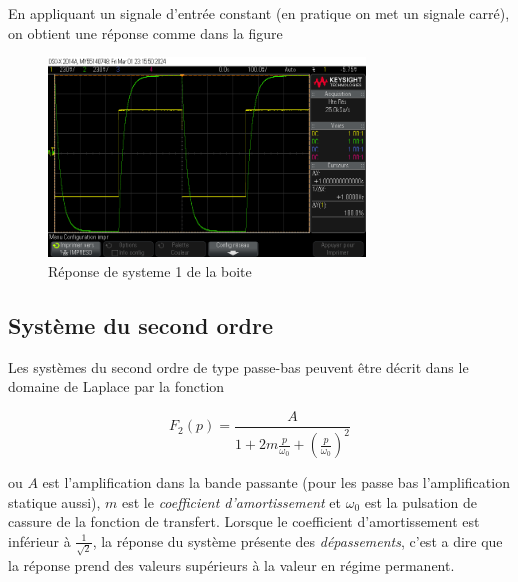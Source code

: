 \documentclass[12pt, a4paper]{report}
\begin{document}
En appliquant un signale d'entrée constant (en pratique on met un signale carré), on obtient une réponse
comme dans la figure 

\begin{figure}[h]
    \centering
    \includegraphics[width=0.75\textwidth]{mesureA1.png}
    \caption{Réponse de systeme 1 de la boite}
    \label{fig:reponse1ersys}
\end{figure}



\subsection{Système du second ordre}

Les systèmes du second ordre de type passe-bas peuvent être décrit dans le domaine de Laplace par 
la fonction

\[
  F_{2} (p) =   \frac{A}{1 + 2m \frac{p}{\omega_{0}} + \left( \frac{p}{\omega_{0}} \right)^2}
\]

ou $A$ est l'amplification dans la bande passante (pour les passe bas l'amplification statique aussi), 
$m$ est le \textit{coefficient d'amortissement} et $\omega_{0}$ est la pulsation de cassure de la fonction de 
transfert. Lorsque le coefficient d'amortissement est inférieur à $\frac{1}{\sqrt{2}}$, la réponse du système présente
des \textit{dépassements}, c'est a dire que la réponse prend des valeurs supérieurs à la valeur en régime permanent.
\end{document}

